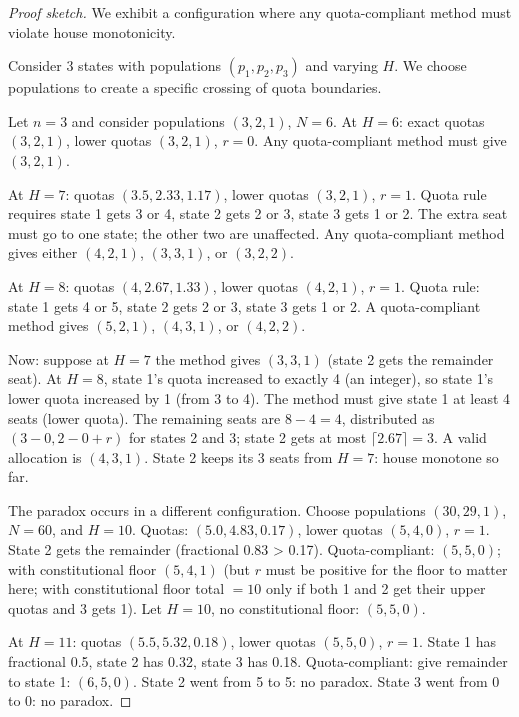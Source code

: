 \begin{proof}[Proof sketch]
  We exhibit a configuration where any quota-compliant method must
  violate house monotonicity.

  Consider 3 states with populations $(p_1, p_2, p_3)$ and varying $H$.
  We choose populations to create a specific crossing of quota boundaries.

  Let $n = 3$ and consider populations $(3, 2, 1)$, $N = 6$.
  At $H = 6$: exact quotas $(3, 2, 1)$, lower quotas $(3,2,1)$, $r=0$.
  Any quota-compliant method must give $(3,2,1)$.

  At $H = 7$: quotas $(3.5, 2.33, 1.17)$, lower quotas $(3,2,1)$, $r=1$.
  Quota rule requires state 1 gets 3 or 4, state 2 gets 2 or 3,
  state 3 gets 1 or 2.
  The extra seat must go to one state; the other two are unaffected.
  Any quota-compliant method gives either $(4,2,1)$, $(3,3,1)$, or $(3,2,2)$.

  At $H = 8$: quotas $(4, 2.67, 1.33)$, lower quotas $(4,2,1)$, $r=1$.
  Quota rule: state 1 gets 4 or 5, state 2 gets 2 or 3, state 3 gets 1 or 2.
  A quota-compliant method gives $(5,2,1)$, $(4,3,1)$, or $(4,2,2)$.

  Now: suppose at $H=7$ the method gives $(3,3,1)$
  (state 2 gets the remainder seat).
  At $H=8$, state 1's quota increased to exactly 4 (an integer),
  so state 1's lower quota increased by 1 (from 3 to 4).
  The method must give state 1 at least 4 seats (lower quota).
  The remaining seats are $8 - 4 = 4$, distributed as $(3-0, 2-0+r)$
  for states 2 and 3; state 2 gets at most $\lceil 2.67 \rceil = 3$.
  A valid allocation is $(4, 3, 1)$.
  State 2 keeps its 3 seats from $H=7$: house monotone so far.

  The paradox occurs in a different configuration.
  Choose populations $(30, 29, 1)$, $N = 60$, and $H = 10$.
  Quotas: $(5.0, 4.83, 0.17)$, lower quotas $(5,4,0)$, $r=1$.
  State 2 gets the remainder (fractional 0.83 > 0.17).
  Quota-compliant: $(5, 5, 0)$; with constitutional floor $(5, 4, 1)$
  (but $r$ must be positive for the floor to matter here;
  with constitutional floor total $= 10$ only if both 1 and 2 get
  their upper quotas and 3 gets 1).
  Let $H=10$, no constitutional floor: $(5, 5, 0)$.

  At $H=11$: quotas $(5.5, 5.32, 0.18)$, lower quotas $(5,5,0)$, $r=1$.
  State 1 has fractional 0.5, state 2 has 0.32, state 3 has 0.18.
  Quota-compliant: give remainder to state 1: $(6, 5, 0)$.
  State 2 went from 5 to 5: no paradox.
  State 3 went from 0 to 0: no paradox.


\end{proof}
